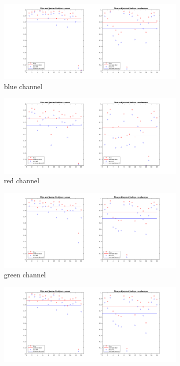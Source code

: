 \documentclass[a4paper,10pt]{article}
\begin{document}
\begin{figure}
	\begin{subfigure}{0.7\textwidth}
		\includegraphics[width=0.9\linewidth]{../results/color-channel-influence/base-evaluation/otsu-dice-jaccard-B.png} 
		\caption{blue channel}
		\label{fig:otsu-blue}
	\end{subfigure}
	\begin{subfigure}{0.7\textwidth}
		\includegraphics[width=0.9\linewidth]{../results/color-channel-influence/base-evaluation/otsu-dice-jaccard-R.png}
		\caption{red channel}
		\label{fig:otsu-red}
	\end{subfigure}
	\begin{subfigure}{0.7\textwidth}
		\includegraphics[width=0.9\linewidth]{../results/color-channel-influence/base-evaluation/otsu-dice-jaccard-G.png}
		\caption{green channel}
		\label{fig:otsu-green}
	\end{subfigure}
	\begin{subfigure}{0.7\textwidth}
		\includegraphics[width=0.9\linewidth]{../results/color-channel-influence/base-evaluation/otsu-dice-jaccard-meanRGB.png}

\end{subfigure}
\end{figure}
\end{document}
